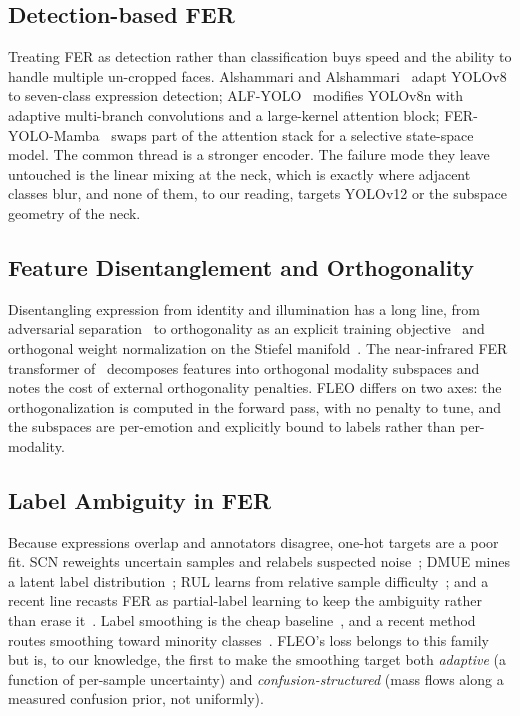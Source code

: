 \documentclass[journal]{IEEEtran}
\begin{document}
\subsection{Detection-based FER}
Treating FER as detection rather than classification buys speed and the
ability to handle multiple un-cropped faces. Alshammari and
Alshammari~\cite{alshammari2024yolov8fer} adapt YOLOv8 to seven-class
expression detection; ALF-YOLO~\cite{ma2025alfyolo} modifies YOLOv8n with
adaptive multi-branch convolutions and a large-kernel attention block;
FER-YOLO-Mamba~\cite{ma2024feryolomamba} swaps part of the attention stack for
a selective state-space model. The common thread is a stronger encoder. The
failure mode they leave untouched is the linear mixing at the neck, which is
exactly where adjacent classes blur, and none of them, to our reading, targets
YOLOv12 or the subspace geometry of the neck.

\subsection{Feature Disentanglement and Orthogonality}
Disentangling expression from identity and illumination has a long line, from
adversarial separation~\cite{ali2019degan} to orthogonality as an explicit
training objective~\cite{bansal2018orthogonality,brock2019biggan} and
orthogonal weight normalization on the Stiefel manifold~\cite{huang2018own}.
The near-infrared FER transformer of~\cite{nir2024hypergraph} decomposes
features into orthogonal modality subspaces and notes the cost of external
orthogonality penalties. FLEO differs on two axes: the orthogonalization is
computed in the forward pass, with no penalty to tune, and the subspaces are
per-emotion and explicitly bound to labels rather than per-modality.

\subsection{Label Ambiguity in FER}
Because expressions overlap and annotators disagree, one-hot targets are a
poor fit. SCN reweights uncertain samples and relabels suspected
noise~\cite{wang2020scn}; DMUE mines a latent label
distribution~\cite{she2021dmue}; RUL learns from relative sample
difficulty~\cite{zhang2021rul}; and a recent line recasts FER as partial-label
learning to keep the ambiguity rather than erase it~\cite{wang2022rethinking}.
Label smoothing is the cheap baseline~\cite{szegedy2016rethinking,muller2019labelsmoothing},
and a recent method routes smoothing toward minority
classes~\cite{navigating2025}. FLEO's loss belongs to this family but is, to
our knowledge, the first to make the smoothing target both \emph{adaptive} (a
function of per-sample uncertainty) and \emph{confusion-structured} (mass flows
along a measured confusion prior, not uniformly).
\end{document}
